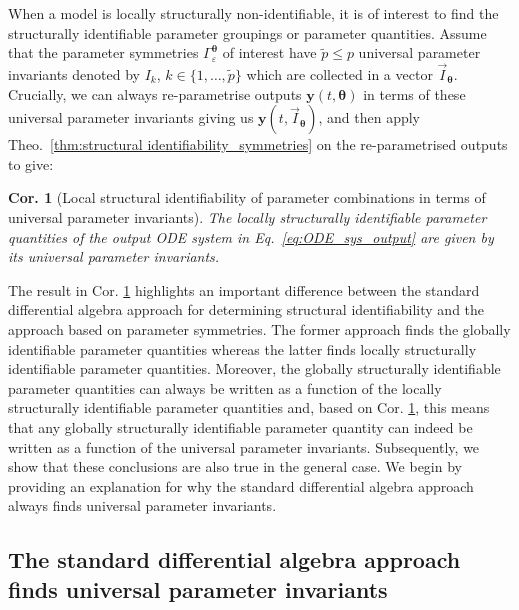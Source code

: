 \documentclass[12pt]{article}
\newtheorem{cor}{Cor.}
\begin{document}
When a model is locally structurally non-identifiable, it is of interest to find the structurally identifiable parameter groupings or parameter quantities. Assume that the parameter symmetries $\Gamma_{\varepsilon}^{\boldsymbol{\theta}}$ of interest have $\tilde{p}\leq{p}$ universal parameter invariants denoted by $I_{k}$, $k\in\{1,\ldots,\tilde{p}\}$ which are collected in a vector $\vec{I}_{\boldsymbol{\theta}}$. Crucially, we can always re-parametrise outputs $\mathbf{y}(t,\boldsymbol{\theta})$ in terms of these universal parameter invariants giving us $\mathbf{y}(t,\vec{I}_{\boldsymbol{\theta}})$, and then apply Theo.~\ref{thm:structural identifiability_symmetries} on the re-parametrised outputs to give:

\medskip
\begin{cor}[Local structural identifiability of parameter combinations in terms of universal parameter invariants]
The \textit{locally structurally identifiable} parameter quantities of the output ODE system in Eq.~\eqref{eq:ODE_sys_output} are given by its universal parameter invariants.
\label{cor:structural_identifiability_symmetries}
\end{cor}

\medskip
The result in Cor. \ref{cor:structural_identifiability_symmetries} highlights an important difference between the standard differential algebra approach for determining structural identifiability and the approach based on parameter symmetries. The former approach finds the globally identifiable parameter quantities whereas the latter finds locally structurally identifiable parameter quantities. Moreover, the globally structurally identifiable parameter quantities can always be written as a function of the locally structurally identifiable parameter quantities and, based on Cor. \ref{cor:structural_identifiability_symmetries}, this means that any globally structurally identifiable parameter quantity can indeed be written as a function of the universal parameter invariants. Subsequently, we show that these conclusions are also true in the general case. We begin by providing an explanation for why the standard differential algebra approach always finds universal parameter invariants.



\subsection{The standard differential algebra approach finds universal parameter invariants}
\end{document}
